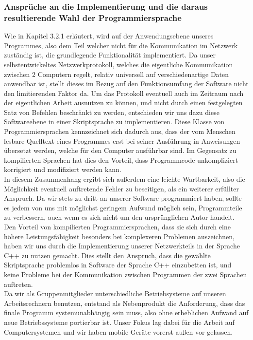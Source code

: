 \subsubsection{Ansprüche an die Implementierung und die daraus resultierende Wahl der Programmiersprache}
Wie in Kapitel 3.2.1 erläutert, wird auf der Anwendungsebene unseres Programmes, also dem Teil welcher nicht für die Kommunikation im Netzwerk zuständig ist, die grundlegende Funktionalität implementiert. Da unser selbstentwickeltes Netzwerkprotokoll, welches die eigentliche Kommunikation zwischen 2 Computern regelt, relativ universell auf verschiedenartige Daten anwendbar ist, stellt dieses im Bezug auf den Funktionsumfang der Software nicht den limitierenden Faktor da. Um das Protokoll eventuell auch im Zeitraum nach der eigentlichen Arbeit ausnutzen zu können, und nicht durch einen festgelegten Satz von Befehlen beschränkt zu werden, entschieden wir uns dazu diese Softwareebene in einer Skriptsprache zu implementieren.
Diese Klasse von Programmiersprachen kennzeichnet sich dadurch aus, dass der vom Menschen lesbare Quelltext eines Programmes erst bei seiner Ausführung in Anweisungen übersetzt werden, welche für den Computer ausführbar sind. Im Gegensatz zu kompilierten Sprachen hat dies den Vorteil, dass Programmcode unkompliziert korrigiert und modifiziert werden kann.\\
In diesem Zusammenhang ergibt sich außerdem eine leichte Wartbarkeit, also die Möglichkeit eventuell auftretende Fehler zu beseitigen, als ein weiterer erfüllter Anspruch. Da wir stets zu dritt an unserer Software programmiert haben, sollte es jedem von uns mit möglichst geringem Aufwand möglich sein, Programmteile zu verbessern, auch wenn es sich nicht um den ursprünglichen Autor handelt.\\
Den Vorteil von kompilierten Programmiersprachen, dass sie sich durch eine höhere Leistungsfähigkeit besonders bei komplexeren Problemen auszeichnen, haben wir uns durch die Implementierung unserer Netzwerkteils in der Sprache C++ zu nutzen gemacht. Dies stellt den Anspruch, dass die gewählte Skriptsprache problemlos in Software der Sprache C++ einzubetten ist, und keine Probleme bei der Kommunikation zwischen Programmen der zwei Sprachen auftreten.\\
Da wir als Gruppenmitglieder unterschiedliche Betriebsysteme auf unseren Arbeitsrechnern benutzen, entstand als Nebenprodukt die Anforderung, dass das finale Programm systemunabhängig sein muss, also ohne erheblichen Aufwand auf neue Betriebssysteme portierbar ist. Unser Fokus lag dabei für die Arbeit auf Computersystemen und wir haben mobile Geräte vorerst außen vor gelassen.
